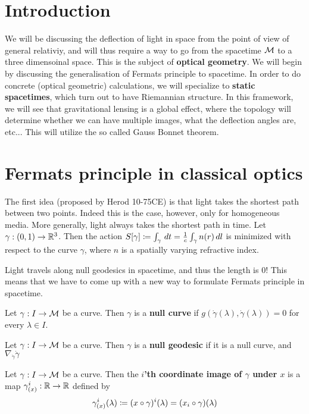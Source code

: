 
\section{Introduction}
We will be discussing the deflection of light in space from the point of view of general relativiy, and will thus require a way to go from the spacetime $\mathcal{M}$ to a three dimensoinal space.
This is the subject of \textbf{optical geometry}.
We will begin by discussing the generalisation of Fermats principle to spacetime. In order to do concrete (optical geometric) calculations, we will specialize to \textbf{static spacetimes}, which turn out to have Riemannian structure.
In this framework, we will see that gravitational lensing is a global effect, where the topology will determine whether we can have multiple images, what the deflection angles are, etc... This will utilize the so called Gauss Bonnet theorem.

\section{Fermats principle in classical optics}
The first idea (proposed by Herod 10-75CE) is that light takes the shortest path between two points.
Indeed this is the case, however, only for homogeneous media.
More generally, light always takes the shortest path in time.
Let $\gamma: (0,1) \to \mathbb{R}^3$.
Then the action $S[\gamma] \coloneqq \int_{\gamma} \, dt = \frac{1}{c}\int_{\gamma} n(r) \, dl$ is minimized with respect to the curve $\gamma$, where $n$ is a spatially varying refractive index.
\begin{remark}[]\label{}
Light travels along null geodesics in spacetime, and thus the length is $0$! This means that we have to come up with a new way to formulate Fermats principle in spacetime.
\end{remark}

\begin{definition}[]\label{}
Let $\gamma: I \to \mathcal{M}$ be a curve. Then $\gamma$ is a \textbf{null curve} if $g(\dot{\gamma}(\lambda), \dot{\gamma}(\lambda))=0$ for every $\lambda \in I$.
\end{definition}
%
\begin{definition}[]\label{}
Let $\gamma: I \to \mathcal{M}$ be a curve. Then $\gamma$ is a \textbf{null geodesic} if it is a null curve, and $\nabla_{\dot{\gamma}} \dot{\gamma}$
\end{definition}

\begin{definition}[]\label{}
Let $\gamma: I \to \mathcal{M}$ be a curve. Then the \textbf{$i$'th coordinate image of $\gamma$ under $x$} is a map $\gamma^i_{(x)}: \mathbb{R} \to \mathbb{R}$ defined by
\begin{equation}\label{}
\gamma^i_{(x)}(\lambda) \coloneqq (x \circ \gamma)^i (\lambda) = (x_i \circ \gamma) (\lambda)
\end{equation}
\end{definition}

